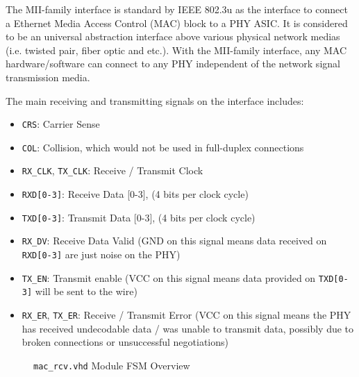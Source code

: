 \documentclass[a4paper]{report}
\newcommand{\code}{\texttt}
\begin{document}
The MII-family interface is standard by IEEE 802.3u \cite{ieee802.3ethernet-2018} as the interface to connect a Ethernet Media Access Control (MAC) block to a PHY ASIC. It is considered to be an universal abstraction interface above various physical network medias (i.e. twisted pair, fiber optic and etc.). With the MII-family interface, any MAC hardware/software can connect to any PHY independent of the network signal transmission media.

The main receiving and transmitting signals on the interface includes:
\begin{itemize}
    \item \code{CRS}: Carrier Sense
    \item \code{COL}: Collision, which would not be used in full-duplex connections
    \item \code{RX\_CLK}, \code{TX\_CLK}: Receive / Transmit Clock
    \item \code{RXD[0-3]}: Receive Data [0-3],  (4 bits per clock cycle)
    \item \code{TXD[0-3]}: Transmit Data [0-3],  (4 bits per clock cycle)
    \item \code{RX\_DV}: Receive Data Valid (GND on this signal means data received on \code{RXD[0-3]} are just noise on the PHY)
    \item \code{TX\_EN}: Transmit enable (VCC on this signal means data provided on \code{TXD[0-3]} will be sent to the wire)
    \item \code{RX\_ER}, \code{TX\_ER}: Receive / Transmit Error (VCC on this signal means the PHY has received undecodable data / was unable to transmit data, possibly due to broken connections or unsuccessful negotiations)
\end{itemize}

\begin{figure}[h!]
  \caption{\code{mac\_rcv.vhd} Module FSM Overview}
  \label{fig:rcv-fsm}
\end{figure}
\end{document}
